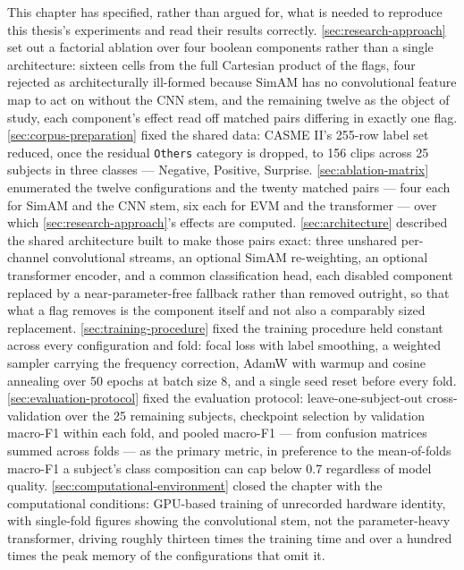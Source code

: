 This chapter has specified, rather than argued for, what is needed to reproduce this thesis's experiments and read their results correctly. \autoref{sec:research-approach} set out a factorial ablation over four boolean components rather than a single architecture: sixteen cells from the full Cartesian product of the flags, four rejected as architecturally ill-formed because SimAM has no convolutional feature map to act on without the CNN stem, and the remaining twelve as the object of study, each component's effect read off matched pairs differing in exactly one flag. \autoref{sec:corpus-preparation} fixed the shared data: CASME II's 255-row label set reduced, once the residual \texttt{Others} category is dropped, to 156 clips across 25 subjects in three classes --- Negative, Positive, Surprise. \autoref{sec:ablation-matrix} enumerated the twelve configurations and the twenty matched pairs --- four each for SimAM and the CNN stem, six each for EVM and the transformer --- over which \autoref{sec:research-approach}'s effects are computed. \autoref{sec:architecture} described the shared architecture built to make those pairs exact: three unshared per-channel convolutional streams, an optional SimAM re-weighting, an optional transformer encoder, and a common classification head, each disabled component replaced by a near-parameter-free fallback rather than removed outright, so that what a flag removes is the component itself and not also a comparably sized replacement. \autoref{sec:training-procedure} fixed the training procedure held constant across every configuration and fold: focal loss with label smoothing, a weighted sampler carrying the frequency correction, AdamW with warmup and cosine annealing over 50 epochs at batch size 8, and a single seed reset before every fold. \autoref{sec:evaluation-protocol} fixed the evaluation protocol: leave-one-subject-out cross-validation over the 25 remaining subjects, checkpoint selection by validation macro-F1 within each fold, and pooled macro-F1 --- from confusion matrices summed across folds --- as the primary metric, in preference to the mean-of-folds macro-F1 a subject's class composition can cap below 0.7 regardless of model quality. \autoref{sec:computational-environment} closed the chapter with the computational conditions: GPU-based training of unrecorded hardware identity, with single-fold figures showing the convolutional stem, not the parameter-heavy transformer, driving roughly thirteen times the training time and over a hundred times the peak memory of the configurations that omit it.

